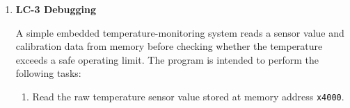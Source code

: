 \documentclass{article}
\begin{document}
\begin{enumerate}[label=(\alph*)]
\textcolor{purple}{.ORIG x3100}

    \textcolor{gray}{; assume code for entry point is omitted}\\
    \textcolor{gray}{;}\\
    \textcolor{gray}{;}\\
    \textcolor{gray}{;}\\

    \textcolor{purple}{PERMUTE} \newline
    \textcolor{gray}{; write the code here}
    \\
    \\
    \\
    \\
    \\
    \\
    \\
    \\
    \\
    \\
    \textcolor{gray}{; code ends here}
    
    \textcolor{purple}{RET}
    \newline \textcolor{gray}{; code omitted}
    \newline    \textcolor{gray}{;}
    \newline \textcolor{purple}{.HALT}
    \textcolor{gray}{; labels below}
    \newline
    \textcolor{purple}{CLEARX2X3 .FILL \#0xF00F}
    \newline
    \textcolor{purple}{FOUR .FILL \#4}
    \newline
    \textcolor{purple}{X2 .FILL 0x0F00}
    \newline
    \textcolor{purple}{X3 .FILL 0x00F0}
    \newline
    \textcolor{purple}{SAVER7 .FILL \#0}
    \newline
    \textcolor{purple}{.END}

\item \textbf{LC-3 Debugging}

A simple embedded temperature-monitoring system reads a sensor value and calibration data from memory before checking whether the temperature exceeds a safe operating limit. The program is intended to perform the following tasks:

\begin{enumerate}
    \item Read the raw temperature sensor value stored at memory address
    \texttt{x4000}.
    

\end{enumerate}
\end{enumerate}
\end{document}
